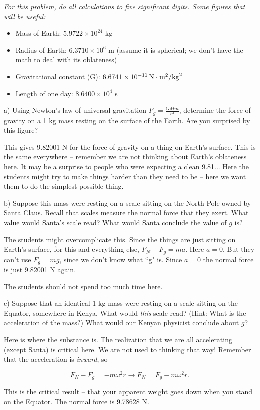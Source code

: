 \documentclass[12pt]{article}
\newcommand{\BI}{\begin{itemize}}
\newcommand{\EI}{\end{itemize}}
\begin{document}
\it For this problem, do all calculations to five significant digits. Some figures that will be useful:

\rm
\BI
\item Mass of Earth: $5.9722\times 10^{24}$ kg
\item Radius of Earth: $ 6.3710 \times 10^6$ m (assume it is spherical; we don't have the math to deal with its oblateness)
\item Gravitational constant (G): $6.6741 \times 10^{-11} \,\rm N\cdot \rm m^2/{\rm kg}^2$
\item Length of one day: $8.6400 \times 10^4$ s
\EI


a) Using Newton's law of universal gravitation $F_g=\frac{GMm}{r^2}$, determine the force of gravity on a 1 kg mass resting on the surface of the Earth. Are you surprised by this figure?

{\color{Red} This gives 9.82001 N for the force of gravity on a thing on Earth's surface. This is the same everywhere -- remember we are not thinking about Earth's oblateness here. 
	It may be a surprise to people who were expecting a clean 9.81... Here the students might try to make things harder than they need to be -- here we want them to do the simplest possible thing.
}


b) Suppose this mass were resting on a scale sitting on the North Pole owned by Santa Claus. Recall that scales measure
the normal force that they exert. What value would Santa's scale read? What would Santa conclude the value of $g$ is?

{\color{Red} The students might overcomplicate this. Since the things are just sitting on Earth's surface, for this and everything else, $F_N - F_g = ma$. Here $a=0$. But they can't use $F_g = mg$, since we don't know what ``g" is. Since $a=0$ the normal force is just 9.82001 N again.

The students should not spend too much time here.
}



c) Suppose that an identical 1 kg mass were resting on a scale sitting on the Equator, somewhere in Kenya. What would {\it this} scale read? (Hint: What is the acceleration of the mass?) What would our Kenyan physicist conclude about $g$?

{\color{Red} Here is where the substance is. The realization that we are all accelerating (except Santa) is critical here. We are not used to thinking that way! Remember that the acceleration is {\it inward}, so 
	
	$$F_N - F_g = -m\omega^2 r \rightarrow F_N = F_g - m \omega^2 r.$$
	
	This is the critical result -- that your apparent weight goes down when you stand on the Equator. The normal force is 9.78628 N.
}
\end{document}
